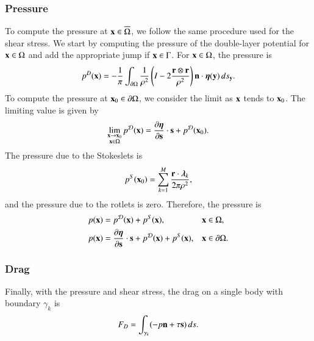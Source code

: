 \documentclass[preprint, 10pt]{elsarticle}
\begin{document}
\subsubsection{Pressure}
To compute the pressure at ${\mathbf{x}} \in \overline{\Omega}$, we follow the
same procedure used for the shear stress.  We start by computing the
pressure of the double-layer potential for ${\mathbf{x}} \in \Omega$ and add the
appropriate jump if ${\mathbf{x}} \in \Gamma$. For ${\mathbf{x}} \in \Omega$, the pressure
is
\begin{align}
  p^{D}({\mathbf{x}}) = -\frac{1}{\pi}\int_{{\partial}\Omega} \frac{1}{\rho^2}
    \left(I - 2 \frac{{\mathbf{r}} \otimes {\mathbf{r}}}{\rho^2}\right) 
    {\mathbf{n}} \cdot {\boldsymbol\eta}({\mathbf{y}}) \,ds_{\mathbf{y}}.
    \label{eqn:pressureDLP}
\end{align}
To compute the pressure at ${\mathbf{x}}_0 \in {\partial}\Omega$, we consider the limit
as ${\mathbf{x}}$ tends to ${\mathbf{x}}_0$.  The limiting value is given
by~\cite{qua-bir2014a}
\begin{align}
  \lim_{\substack{{\mathbf{x}} \rightarrow {\mathbf{x}}_0 \\ {\mathbf{x}} \in \Omega}}p^{\mathcal{D}}({\mathbf{x}}) =  
    \frac{\partial {\boldsymbol\eta}}{\partial {\mathbf{s}}} \cdot {\mathbf{s}} + p^{{\mathcal{D}}}({\mathbf{x}}_0).
  \label{eqn:pressureJump}
\end{align}
The pressure due to the Stokeslets is
\begin{align*}
  p^S({\mathbf{x}}_0) = \sum_{k=1}^{M}\frac{{\mathbf{r}} \cdot {\boldsymbol\lambda}_k}{2\pi\rho^2},
\end{align*}
and the pressure due to the rotlets is zero.  Therefore, the pressure is
\begin{align*}
  p({\mathbf{x}}) &= p^{{\mathcal{D}}}({\mathbf{x}}) + p^{S}({\mathbf{x}}), \quad &&{\mathbf{x}} \in \Omega,\\
  p({\mathbf{x}}) &= \frac{\partial {\boldsymbol\eta}}{\partial {\mathbf{s}}} \cdot {\mathbf{s}} + p^{{\mathcal{D}}}({\mathbf{x}}) + 
              p^{S}({\mathbf{x}}), && {\mathbf{x}} \in {\partial}\Omega.
\end{align*}

\subsubsection{Drag}
Finally, with the pressure and shear stress, the drag on a single body
with boundary $\gamma_k$ is
\begin{align}
  F_D = \int_{\gamma_k} (-p {\mathbf{n}} + \tau {\mathbf{s}})\,ds.
  \label{eqn:drag}
\end{align}
\end{document}
